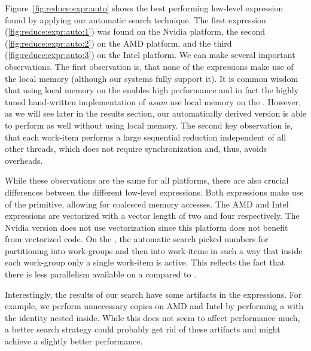 Figure~\ref{fig:reduce:expr:auto} shows the best performing low-level expression found by applying our automatic search technique.
The first expression (\autoref{fig:reduce:expr:auto:1}) was found on the Nvidia platform, the second (\autoref{fig:reduce:expr:auto:2}) on the AMD platform, and the third (\autoref{fig:reduce:expr:auto:3}) on the Intel platform.
We can make several important observations.
The first observation is, that none of the expressions make use of the local memory (although our systems fully support it).
It is common wisdom that using local memory on the \GPU enables high performance and in fact the highly tuned hand-written implementation of \textit{asum} use local memory on the \GPU.
However, as we will see later in the results section, our automatically derived version is able to perform as well without using local memory.
The second key observation is, that each work-item performs a large sequential reduction independent of all other threads, which does not require synchronization and, thus, avoids overheads.

While these observations are the same for all platforms, there are also crucial differences between the different low-level expressions.
Both \GPU expressions make use of the \reorderStride primitive, allowing for coalesced memory accesses.
The AMD and Intel expressions are vectorized with a vector length of two and four respectively.
The Nvidia version does not use vectorization since this platform does not benefit from vectorized code.
On the \CPU, the automatic search picked numbers for partitioning into work-groups and then into work-items in such a way that inside each work-group only a single work-item is active.
This reflects the fact that there is less parallelism available on a \CPU compared to \GPUs.

Interestingly, the results of our search have some artifacts in the expressions.
For example, we perform unnecessary copies on AMD and Intel by performing a \mapSeq with the identity nested inside.
While this does not seem to affect performance much, a better search strategy could probably get rid of these artifacts and might achieve a slightly better performance.


